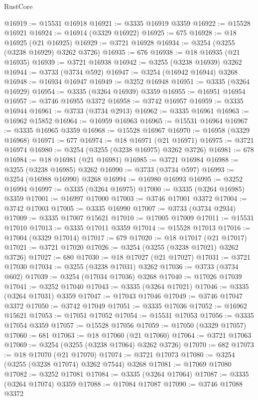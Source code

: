 \begin{lexlean}{RustCore}
\begin{coremodule}
@16919 := @15531 @16918
@16921 := @3335 @16919 @3359
@16922 := @15528 @16921
@16924 := @16914 (@3329 @16922)
@16925 := 675
@16928 := @18 @16925 (@21 @16925)
@16929 := @3721 @16928
@16934 := @3254 (@3255 (@3238 @16929) @3262 @3726)
@16935 := 676
@16938 := @18 @16935 (@21 @16935)
@16939 := @3721 @16938
@16942 := @3255 (@3238 @16939) @3262
@16944 := @3733 (@3734 @592)
@16947 := @3254 (@16942 @16944) @3268
@16948 := @16934 @16947
@16949 := @3252 @16948
@16951 := @3335 (@3264 @16929)
@16954 := @3335 (@3264 @16939) @3359
@16955 := @16951 @16954
@16957 := @3746 @16955 @3372
@16958 := @3742 @16957
@16959 := @3335 @16944
@16961 := @3733 (@3734 @2913)
@16962 := @3335 @16961
@16963 := @16962 @15852
@16964 := @16959 @16963
@16965 := @15531 @16964
@16967 := @3335 @16965 @3359
@16968 := @15528 @16967
@16970 := @16958 (@3329 @16968)
@16971 := 677
@16974 := @18 @16971 (@21 @16971)
@16975 := @3721 @16974
@16980 := @3254 (@3255 (@3238 @16975) @3262 @3726)
@16981 := 678
@16984 := @18 @16981 (@21 @16981)
@16985 := @3721 @16984
@16988 := @3255 (@3238 @16985) @3262
@16990 := @3733 (@3734 @597)
@16993 := @3254 (@16988 @16990) @3268
@16994 := @16980 @16993
@16995 := @3252 @16994
@16997 := @3335 (@3264 @16975)
@17000 := @3335 (@3264 @16985) @3359
@17001 := @16997 @17000
@17003 := @3746 @17001 @3372
@17004 := @3742 @17003
@17005 := @3335 @16990
@17007 := @3733 (@3734 @2934)
@17009 := @3335 @17007 @15621
@17010 := @17005 @17009
@17011 := @15531 @17010
@17013 := @3335 @17011 @3359
@17014 := @15528 @17013
@17016 := @17004 (@3329 @17014)
@17017 := 679
@17020 := @18 @17017 (@21 @17017)
@17021 := @3721 @17020
@17026 := @3254 (@3255 (@3238 @17021) @3262 @3726)
@17027 := 680
@17030 := @18 @17027 (@21 @17027)
@17031 := @3721 @17030
@17034 := @3255 (@3238 @17031) @3262
@17036 := @3733 (@3734 @602)
@17039 := @3254 (@17034 @17036) @3268
@17040 := @17026 @17039
@17041 := @3252 @17040
@17043 := @3335 (@3264 @17021)
@17046 := @3335 (@3264 @17031) @3359
@17047 := @17043 @17046
@17049 := @3746 @17047 @3372
@17050 := @3742 @17049
@17051 := @3335 @17036
@17052 := @16962 @15621
@17053 := @17051 @17052
@17054 := @15531 @17053
@17056 := @3335 @17054 @3359
@17057 := @15528 @17056
@17059 := @17050 (@3329 @17057)
@17060 := 681
@17063 := @18 @17060 (@21 @17060)
@17064 := @3721 @17063
@17069 := @3254 (@3255 (@3238 @17064) @3262 @3726)
@17070 := 682
@17073 := @18 @17070 (@21 @17070)
@17074 := @3721 @17073
@17080 := @3254 (@3255 (@3238 @17074) @3262 @7544) @3268
@17081 := @17069 @17080
@17082 := @3252 @17081
@17084 := @3335 (@3264 @17064)
@17087 := @3335 (@3264 @17074) @3359
@17088 := @17084 @17087
@17090 := @3746 @17088 @3372

\end{coremodule}
\end{lexlean}

